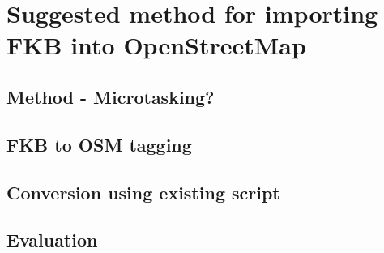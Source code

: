 \chapter{Suggested method for importing FKB into OpenStreetMap}

\section{Method - Microtasking?}


\section{FKB to OSM tagging}


\section{Conversion using existing script}

\section{Evaluation}